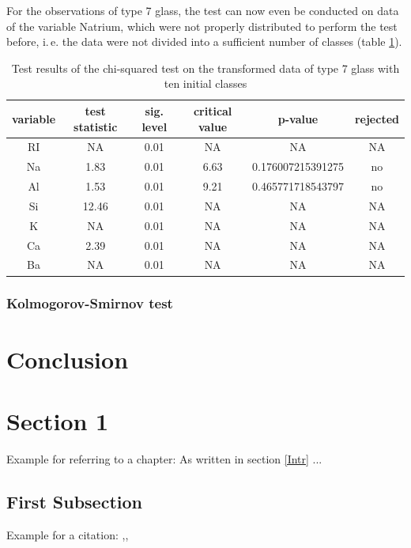 \documentclass[a4paper, 12pt, titlepage, headsepline, listof = totoc, bibliography = totoc, numbers = noenddot]{scrartcl}
\newcommand{\ie}{i.\,e. }
\begin{document}
For the observations of type 7 glass, the test can now even be conducted on data of the variable Natrium, which were not properly distributed to perform the test before, \ie the data were not divided into a sufficient number of classes (table \ref{tab:chi-type7-trans}).

\begin{table}[h!]
\centering
\begin{tabular}{|cccccc|} \hline variable & test statistic & sig. level & critical value & p-value & rejected\\ \hline RI & NA & 0.01 & NA & NA & NA\\ 
Na & 1.83 & 0.01 & 6.63 & 0.176007215391275 & no\\ 
Al & 1.53 & 0.01 & 9.21 & 0.465771718543797 & no\\ 
Si & 12.46 & 0.01 & NA & NA & NA\\ 
K & NA & 0.01 & NA & NA & NA\\ 
Ca & 2.39 & 0.01 & NA & NA & NA\\ 
Ba & NA & 0.01 & NA & NA & NA\\ \hline \end{tabular}\caption{Test results of the chi-squared test on the transformed data of type 7 glass with ten initial classes}
\label{tab:chi-type7-trans}
\end{table}

\subsubsection{Kolmogorov-Smirnov test}

\newpage
\section{Conclusion}












\newpage
\section{Section 1}
Example for referring to a chapter: As written in section \ref{Intr} ...

  \subsection{First Subsection}
	Example for a citation: \cite{sqltuerker},\cite{journals/jods/VolzSM05}, \cite{das}\\
\end{document}
